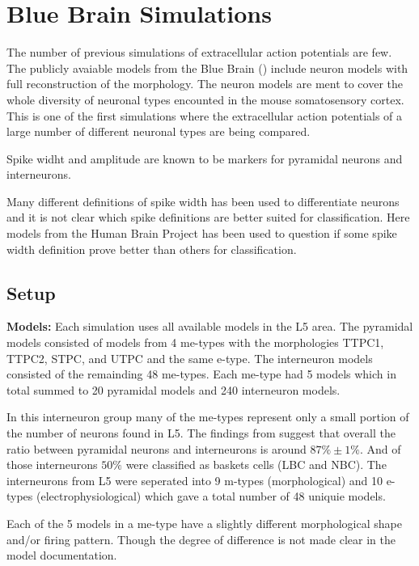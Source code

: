 \documentclass[altfont, fleqn]{uiophd}
\renewcommand{\cref}[1]{{\color{viridis_03}\mycref{#1}}}
\begin{document}
\newpage
\section{Blue Brain Simulations}
The number of previous simulations of extracellular action potentials are
few. 
The publicly avaiable models from the Blue Brain
(\cref{sec:blue_brain})
include neuron models with full reconstruction of the morphology. 
The neuron models are ment to cover the whole diversity of neuronal
types encounted in the mouse somatosensory cortex. 
This is one of the first simulations where 
the extracellular action potentials
of a large number of different neuronal types are being compared. 

Spike widht and amplitude are known to be markers 
for pyramidal neurons and interneurons. 

Many different definitions of spike width has been used to differentiate neurons
and it is not clear which spike definitions are better suited for classification.
Here models from the Human Brain Project
has been used to question
if some spike width definition prove better than others for classification.
\newline
\subsection{Setup}
\noindent
\textbf{Models:}
Each simulation uses all available models in the L5
area. 
The pyramidal models consisted of models
from 4 me-types with the morphologies
TTPC1, TTPC2, STPC, and UTPC and the same e-type. 
The interneuron models consisted of the remainding 48 me-types.
Each me-type had 5 models which in total summed to 20
pyramidal models and 240 interneuron models. 

In this interneuron group many of the 
me-types represent only
a small portion of the number of neurons found in L5. 
The findings from 
\textcite{markram_reconstruction_2015} 
suggest
that overall the ratio between pyramidal neurons
and interneurons is around $87\% \pm 1\%$. 
And of those interneurons $50\%$ were classified as 
baskets cells (LBC and NBC).
The interneurons from L5 were seperated into 
9 m-types (morphological) and 10 e-types (electrophysiological)
which gave a total number
of 48 uniquie models.

Each of the 5 models in a me-type 
have a slightly different morphological
shape and/or firing pattern. 
Though the degree of difference is not made clear in the 
model documentation. 
\end{document}

